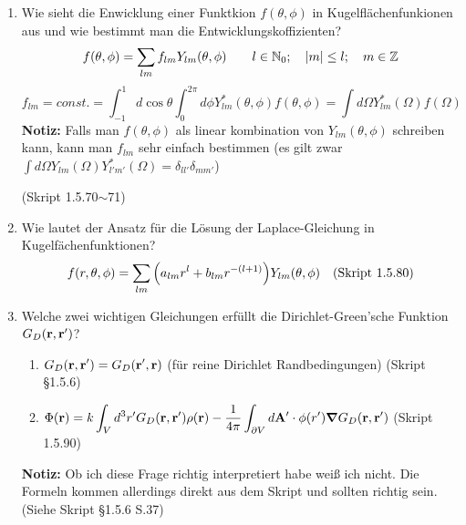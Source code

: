 \documentclass{scrartcl}
\newcommand{\ds}{\displaystyle}
\begin{document}
\begin{enumerate}
    \item Wie sieht die Enwicklung einer Funktkion $f(\theta,\phi)$ in
          Kugelflächenfunkionen aus und wie bestimmt man die 
          Entwicklungskoffizienten?
          $$\ds f(\theta, \phi)=\sum_{lm} f_{lm}Y_{lm}(\theta,\phi)
          \qquad l\in \mathbb{N}_0;\quad \abs{m}\le l; 
          \quad m\in\mathbb{Z}$$
          $$\ds f_{lm}=const.
           =\int_{-1}^{1} d\cos\theta\int_0^{2\pi}d\phi 
           Y^*_{lm}(\theta,\phi)f(\theta,\phi)
           =\int d\Omega Y^*_{lm}(\Omega)f(\Omega)$$
           \textbf{Notiz:} Falls man $f(\theta,\phi)$ als linear kombination
           von $Y_{lm}(\theta,\phi)$ schreiben kann, kann man $f_{lm}$
           sehr einfach bestimmen (es gilt zwar $\ds \int d\Omega 
           Y_{lm}(\Omega)Y_{l'm'}^*(\Omega)=\delta_{ll'}\delta_{mm'}$)
          \begin{center}
            (Skript 1.5.70$\sim$71)
          \end{center}

    \item Wie lautet der Ansatz für die Lösung der Laplace-Gleichung in
          Kugelfächenfunktionen?\\
          $$f(r,\theta,\phi)=
          \sum_{lm}\qty(a_{lm}r^l+b_{lm}r^{-(l+1)})Y_{lm}(\theta,\phi)
          \quad\text{(Skript 1.5.80)}$$
           
    \item Welche zwei wichtigen Gleichungen erfüllt die Dirichlet-Green'sche
          Funktion $G_D(\vb r, \vb r')$?
          \begin{center}
          \begin{enumerate}
          \item $\ds G_D(\vb r, \vb r')= G_D(\vb r', \vb r)$ 
            (für reine Dirichlet Randbedingungen) (Skript §1.5.6)\\
          \item $\ds \Phi(\vb r)=k\int_V d^3r' G_D(\vb r, \vb r')\rho(\vb r)
             -\frac{1}{4\pi}\int_{\partial V}d\vb A'\cdot\phi(r')
             \grad G_D(\vb r, \vb r')$ (Skript 1.5.90)\\
          \end{enumerate}
          \end{center}
          \textbf{Notiz:} Ob ich diese Frage richtig interpretiert habe 
          weiß ich nicht. Die Formeln kommen allerdings direkt aus dem
          Skript und sollten richtig sein.\\
          (Siehe Skript §1.5.6 S.37)
  \end{enumerate}
  \newpage
\end{document}
